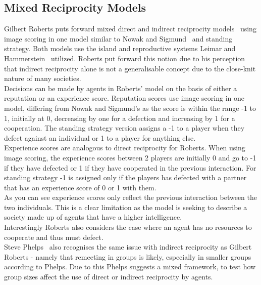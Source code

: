 \documentclass[twoside,twocolumn]{article}
\begin{document}
\subsection{Mixed Reciprocity Models}
Gilbert Roberts puts forward mixed direct and indirect reciprocity models~\cite{evoldirindir} using image scoring in one model similar to Nowak and Sigmund~\cite{evol_indirect_image} and standing strategy. Both models use the island and reproductive systems Leimar and Hammerstein~\cite{leimarhammer} utilized. Roberts put forward this notion due to his perception that indirect reciprocity alone is not a generalisable concept due to the close-knit nature of many societies.\\
Decisions can be made by agents in Roberts' model on the basis of either a reputation or an experience score. Reputation scores use image scoring in one model, differing from Nowak and Sigmund's as the score is within the range -1 to 1, initially at 0, decreasing by one for a defection and increasing by 1 for a cooperation. The standing strategy version assigns a -1 to a player when they defect against an individual or 1 to a player for anything else.\\
Experience scores are analogous to direct reciprocity for Roberts. When using image scoring, the experience scores between 2 players are initially 0 and go to -1 if they have defected or 1 if they have cooperated in the previous interaction. For standing strategy -1 is assigned only if the players has defected with a partner that has an experience score of 0 or 1 with them.\\
As you can see experience scores only reflect the previous interaction between the two individuals. This is a clear limitation as the model is seeking to describe a society made up of agents that have a higher intelligence.\\
Interestingly Roberts also considers the case where an agent has no resources to cooperate and thus must defect.\\
Steve Phelps~\cite{phelps_game_theoretic_analysis} also recognises the same issue with indirect reciprocity as Gilbert Roberts - namely that remeeting in groups is likely, especially in smaller groups according to Phelps. Due to this Phelps suggests a mixed framework, to test how group sizes affect the use of direct or indirect reciprocity by agents.
 
\end{document}
